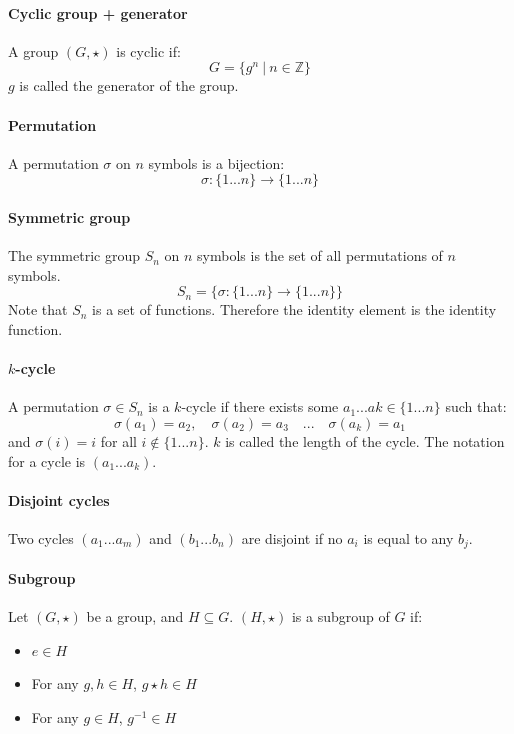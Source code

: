 \documentclass{article}
\newcommand{\Z}{\mathbb{Z}}
\begin{document}
\paragraph{Cyclic group + generator}
A group $ (G, \star) $ is cyclic if:
\begin{equation}
G = \{ g^{n} \ | \ n \in \Z \} 
\end{equation}
$ g $ is called the generator of the group.
\paragraph{Permutation}
A permutation $ \sigma $ on $ n $ symbols is a bijection:
\begin{equation}
\sigma : \{1...n\} \to \{1...n\}
\end{equation}
\paragraph{Symmetric group}
The symmetric group $ S_{n} $ on $ n $ symbols is the set of all permutations of $ n $ symbols.
\begin{equation}
S_{n} = \{\sigma : \{1...n\} \to \{1...n\}\}
\end{equation}
Note that $ S_{n} $ is a set of functions. Therefore the identity element is the identity function.
\paragraph{$ k $-cycle}
A permutation $ \sigma \in S_{n} $ is a $ k $-cycle if there exists some $ a_{1}...a{k}  \in \{1...n\} $ such that:
\begin{equation}
\sigma(a_{1}) = a_{2}, \quad \sigma(a_{2}) = a_{3} \quad ... \quad \sigma(a_{k}) = a_{1}
\end{equation}
and $ \sigma(i) = i $ for all $ i \notin \{1...n\} $. $ k $ is called the length of the cycle. The notation for a cycle is $ (a_{1}...a_{k}) $.
\paragraph{Disjoint cycles}
Two cycles $ (a_{1}...a_{m}) $ and $ (b_{1}...b_{n}) $ are disjoint if no $ a_{i} $ is equal to any $ b_{j} $.
\paragraph{Subgroup}
Let $ (G, \star) $ be a group, and $ H \subseteq G $. $ (H, \star) $ is a subgroup of $ G $ if:
\begin{itemize}
\item $ e \in H $
\item For any $ g, h \in H $,  $ g \star h \in H $
\item For any $ g \in H $, $ g^{-1} \in H $
\end{itemize}
\end{document}
